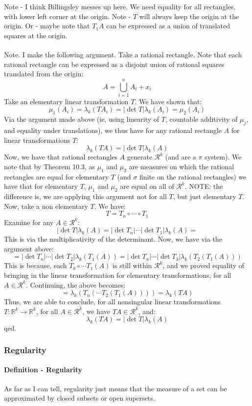 \documentclass[12pt,a4paper]{article}
\newcommand{\1}[1]{\mathbbm{1}\left\{ #1 \right\}}
\newcommand{\R}{\mathbb{R}}
\newcommand{\rcal}{\mathcal{R}}
\begin{document}
Note - I think Billingsley messes up here. We need equality for all rectangles, with lower left corner at the origin. Note - $T$ will always keep the origin at the origin. Or - maybe note that $T_1A$ can be expressed as a union of translated squares at the origin.
\\\\
Note. I make the following argument. Take a rational rectangle. Note that each rational rectangle can be expressed as a disjoint union of rational squares translated from the origin:
$$
	A = \bigcup_{i=1}^n A_i + x_i
$$
Take an elementary linear transformation $T$. We have shown that:
$$
	\mu_1(A_i) = \lambda_k(TA_i) = |\det T| \lambda_k(A_i) = \mu_2(A_i)
$$
Via the argument made above (ie, using linearity of $T$, countable additivity of $\mu_j$, and equality under translations), we thus have for any rational rectangle $A$ for linear transformations $T$:
$$
	\lambda_k(TA) = |\det T| \lambda_k(A)
$$
Now, we have that rational rectangles $A$ generate $\rcal^k$ (and are a $\pi$ system). We note that by Theorem 10.3, as $\mu_1$ and $\mu_2$ are measures on which the rational rectangles are equal for elementary $T$ (and $\sigma$ finite on the rational rectangles) we have that for elementary $T$, $\mu_1$ and $\mu_2$ are equal on all of $\rcal^k$. NOTE: the difference is, we are applying this argument not for all $T$, but just elementary $T$. Now, take a non elementary $T$. We have:
$$
	T = T_n \circ \cdots \circ T_1
$$
Examine for any $A \in \rcal^k$:
$$
	|\det T|\lambda_k(A) =
	|\det T_n| \cdots |\det T_1|\lambda_k(A) =
$$
This is via the multiplicativity of the determinant. Now, we have via the argument above:
$$
	= |\det T_n| \cdots |\det T_2|\lambda_k(T_1(A)) = |\det T_n| \cdots |\det T_3|\lambda_k(T_2(T_1(A)))
$$
This is because, each $T_k \circ \cdots T_1(A)$ is still within $\rcal^k$, and we proved equality of bringing in the linear transformation for elementary transformations, for all $A \in \rcal^k$. Continuing, the above becomes:
$$
	= \lambda_k(T_n(\cdots T_2(T_1(A)))) =
	\lambda_k(TA)
$$
Thus, we are able to conclude, for all nonsingular linear transformations $T: \R^k \to \R^k$, for all $A \in \rcal^k$, we have $TA \in \rcal^k$, and:
$$
	\lambda_k(TA) = |\det T|\lambda_k(A)
$$
qed.

\subsubsection{Regularity}

\paragraph{Definition - Regularity} As far as I can tell, regularity just means that the measure of a set can be approximated by closed subsets or open supersets.
\end{document}
